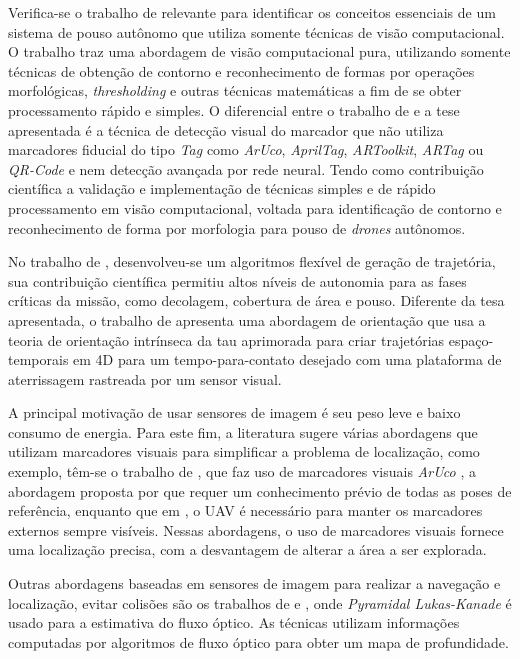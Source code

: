     Verifica-se o trabalho de \citet{Vidal2016} relevante para identificar os conceitos essenciais de um sistema de pouso autônomo que utiliza somente técnicas de visão computacional. O trabalho traz uma abordagem de visão computacional pura, utilizando somente técnicas de obtenção de contorno e reconhecimento de formas por operações morfológicas, \textit{thresholding} e outras técnicas matemáticas a fim de se obter processamento rápido e simples. O diferencial entre o trabalho de \citet{Vidal2016} e a tese apresentada é a técnica de detecção visual do marcador que não utiliza marcadores fiducial do tipo \textit{Tag} como \textit{ArUco}, \textit{AprilTag}, \textit{ARToolkit}, \textit{ARTag} ou \textit{QR-Code} e nem detecção avançada por rede neural. Tendo como contribuição científica a validação e implementação de técnicas simples e de rápido processamento em visão computacional, voltada para identificação de contorno e reconhecimento de forma por morfologia para pouso de \textit{drones} autônomos.
    
    No trabalho de \citet{Vetrella2017}, desenvolveu-se um algoritmos flexível de geração de trajetória, sua contribuição científica permitiu altos níveis de autonomia para as fases críticas da missão, como decolagem, cobertura de área e pouso. Diferente da tesa apresentada, o trabalho de \citet{Vetrella2017} apresenta uma abordagem de orientação que usa a teoria de orientação intrínseca da tau aprimorada para criar trajetórias espaço-temporais em 4D para um tempo-para-contato desejado com uma plataforma de aterrissagem rastreada por um sensor visual.
    

    A principal motivação de usar sensores de imagem é seu peso leve e baixo consumo de energia. Para este fim, a literatura sugere várias abordagens que utilizam marcadores visuais para simplificar a problema de localização, como exemplo, têm-se o trabalho de \citet{Pestana2016}, que faz uso de marcadores visuais \textit{ArUco} \citet{Salinas2013}, a abordagem proposta por \citet{Jayatilleke2013} que requer um conhecimento prévio de todas as poses de referência, enquanto que em \citet{Faigl2013}, o UAV é necessário para manter os marcadores externos sempre visíveis. Nessas abordagens, o uso de marcadores visuais fornece uma localização precisa, com a desvantagem de alterar a área a ser explorada.
    
    Outras abordagens baseadas em sensores de imagem para realizar a navegação e localização, evitar colisões são os trabalhos de \citet{Zingg2010} e \citet{Lippiello2011}, onde \textit{Pyramidal Lukas-Kanade} é usado para a estimativa do fluxo óptico. As técnicas utilizam informações computadas por algoritmos de fluxo óptico para obter um mapa de profundidade.
    
